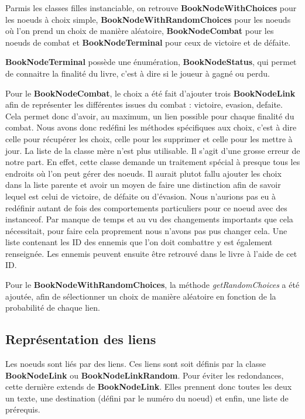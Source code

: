 			Parmis les classes filles instanciable, on retrouve \textbf{BookNodeWithChoices} pour les noeuds à choix simple, \textbf{BookNodeWithRandomChoices} pour les noeuds où l'on prend un choix de manière aléatoire, \textbf{BookNodeCombat} pour les noeuds de combat et \textbf{BookNodeTerminal} pour ceux de victoire et de défaite.

			\textbf{BookNodeTerminal} possède une énumération, \textbf{BookNodeStatus}, qui permet de connaitre la finalité du livre, c'est à dire si le joueur à gagné ou perdu.

			Pour le \textbf{BookNodeCombat}, le choix a été fait d'ajouter trois \textbf{BookNodeLink} afin de représenter les différentes issues du combat : victoire, evasion, defaite. Cela permet donc d'avoir, au maximum, un lien possible pour chaque finalité du combat. Nous avons donc redéfini les méthodes spécifiques aux choix, c'est à dire celle pour récupérer les choix, celle pour les supprimer et celle pour les mettre à jour. La liste de la classe mère n'est plus utilisable. Il s'agit d'une grosse erreur de notre part. En effet, cette classe demande un traitement spécial à presque tous les endroits où l'on peut gérer des noeuds. Il aurait plutot fallu ajouter les choix dans la liste parente et avoir un moyen de faire une distinction afin de savoir lequel est celui de victoire, de défaite ou d'évasion. Nous n'aurions pas eu à redéfinir autant de fois des comportements particuliers pour ce noeud avec des instanceof. Par manque de temps et au vu des changements importants que cela nécessitait, pour faire cela proprement nous n'avons pas pus changer cela. Une liste contenant les ID des ennemis que l'on doit combattre y est également renseignée. Les ennemis peuvent ensuite être retrouvé dans le livre à l'aide de cet ID.

			Pour le \textbf{BookNodeWithRandomChoices}, la méthode \textit{getRandomChoices} a été ajoutée, afin de sélectionner un choix de manière aléatoire en fonction de la probabilité de chaque lien.

		\subsection{Représentation des liens}
			\label{sub:liens}

			Les noeuds sont liés par des liens. Ces liens sont soit définis par la classe \textbf{BookNodeLink} ou \textbf{BookNodeLinkRandom}. Pour éviter les redondances, cette dernière extends de \textbf{BookNodeLink}. Elles prennent donc toutes les deux un texte, une destination (défini par le numéro du noeud) et enfin, une liste de prérequis.

